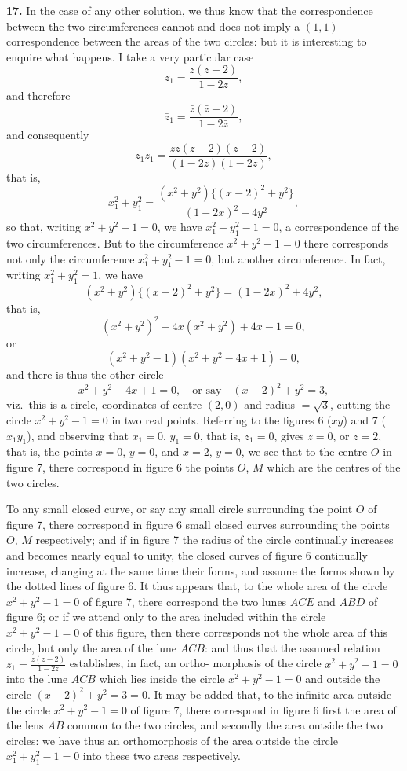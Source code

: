 \documentclass[11pt,a4paper]{book}
\begin{document}
\textbf{17.} In the case of any other solution, we thus know that the correspondence
between the two circumferences cannot and does not imply a $(1, 1)$ correspondence
between the areas of the two circles: but it is interesting to enquire what happens.
I take a very particular case
\[
z_1 = \frac{z(z-2)}{1-2z},
\]
and therefore
\[
\bar{z}_1 = \frac{\bar{z}(\bar{z}-2)}{1-2\bar{z}},
\]
and consequently
\[
z_1\bar{z}_1 = \frac{z\bar{z}(z-2)(\bar{z}-2)}{(1-2z)(1-2\bar{z})},
\]
that is,
\[
x_1^2 + y_1^2 = \frac{(x^2+y^2)\{(x-2)^2+y^2\}}{(1-2x)^2+4y^2},
\]
so that, writing $x^2 + y^2 - 1 = 0$, we have $x_1^2 + y_1^2 - 1 = 0$, a correspondence of the two
circumferences. But to the circumference $x^2 + y^2 - 1 = 0$ there corresponds not only
the circumference $x_1^2 + y_1^2 - 1 = 0$, but another circumference. In fact, writing $x_1^2 + y_1^2 = 1$,
we have
\[
(x^2+y^2)\{(x-2)^2+y^2\} = (1-2x)^2 + 4y^2,
\]
that is,
\[
(x^2+y^2)^2 - 4x(x^2+y^2) + 4x - 1 = 0,
\]
or
\[
(x^2+y^2-1)(x^2+y^2-4x+1) = 0,
\]
and there is thus the other circle
\[
x^2+y^2-4x+1 = 0, \quad \text{or say} \quad (x-2)^2 + y^2 = 3,
\]
viz.~this is a circle, coordinates of centre $(2, 0)$ and radius $= \sqrt{3}$, cutting the circle
$x^2 + y^2 - 1 = 0$ in two real points. Referring to the figures 6 ($xy$) and 7 ($x_1y_1$), and
observing that $x_1 = 0$, $y_1 = 0$, that is, $z_1 = 0$, gives $z = 0$, or $z = 2$, that is, the points
$x = 0$, $y = 0$, and $x = 2$, $y = 0$, we see that to the centre $O$ in figure 7, there
correspond in figure 6 the points $O$, $M$ which are the centres of the two circles.

To any small closed curve, or say any small circle surrounding the point $O$ of
figure 7, there correspond in figure 6 small closed curves surrounding the points
$O$, $M$ respectively; and if in figure 7 the radius of the circle continually increases
and becomes nearly equal to unity, the closed curves of figure 6 continually increase,
changing at the same time their forms, and assume the forms shown by the dotted
lines of figure 6. It thus appears that, to the whole area of the circle $x^2 + y^2 - 1 = 0$
of figure 7, there correspond the two lunes $ACE$ and $ABD$ of figure 6; or if we
attend only to the area included within the circle $x^2 + y^2 - 1 = 0$ of this figure, then
there corresponds not the whole area of this circle, but only the area of the lune
$ACB$: and thus that the assumed relation $z_1 = \frac{z(z-2)}{1-2z}$ establishes, in fact, an ortho-\allowbreak
morphosis of the circle $x^2 + y^2 - 1 = 0$ into the lune $ACB$ which lies inside the circle
$x^2 + y^2 - 1 = 0$ and outside the circle $(x - 2)^2 + y^2 = 3 = 0$. It may be added that, to
the infinite area outside the circle $x^2 + y^2 - 1 = 0$ of figure 7, there correspond in
figure 6 first the area of the lens $AB$ common to the two circles, and secondly the
area outside the two circles: we have thus an orthomorphosis of the area outside
the circle $x_1^2 + y_1^2 - 1 = 0$ into these two areas respectively.
\end{document}
